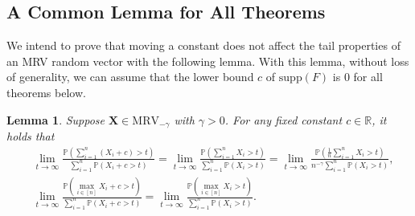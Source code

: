 \documentclass[12pt]{article}
\theoremstyle{plain}
\theoremstyle{plain}
\newtheorem{lem}{Lemma}[section]
\theoremstyle{definition}
\renewcommand{\Pr}{\mathbb{P}}
\newcommand{\R}{\mathbb{R}}
\begin{document}
\subsection{A Common Lemma for All Theorems}
\label{subsec:moving-constant-does-not-affect-tail}
We intend to prove that moving a constant does not affect the tail properties of an MRV random vector with the following lemma. With this lemma, without loss of generality, we can assume that the lower bound $c$ of $\mathrm{supp}(F)$ is $0$ for all theorems below.

\begin{lem}
\label{lemma:mrv-robust-to-shift}
Suppose $\mathbf{X}\in\mathrm{MRV}_{-\gamma}$ with $\gamma>0$. For any fixed constant $c\in\R$, it holds that
\begin{align}
&\lim_{t\to\infty}\frac{\Pr\left(\sum_{i=1}^n (X_i+c)>t\right)}{\sum_{i=1}^n\Pr\left(X_i+c>t\right)}
=\lim_{t\to\infty}\frac{\Pr\left(\sum_{i=1}^n X_i>t\right)}{\sum_{i=1}^n\Pr\left(X_i>t\right)}
=\lim_{t\to\infty}\frac{\Pr\left(\frac{1}{n}\sum_{i=1}^n X_i>t\right)}{n^{-\gamma}\sum_{i=1}^n\Pr\left(X_i>t\right)},\\
&\lim_{t\to\infty}\frac{\Pr\left(\max_{i\in[n]} X_i+c>t\right)}{\sum_{i=1}^n\Pr\left(X_i+c>t\right)}
=\lim_{t\to\infty}\frac{\Pr\left(\max_{i\in[n]} X_i>t\right)}{\sum_{i=1}^n\Pr\left(X_i>t\right)}.
\end{align}
\end{lem}
\end{document}
